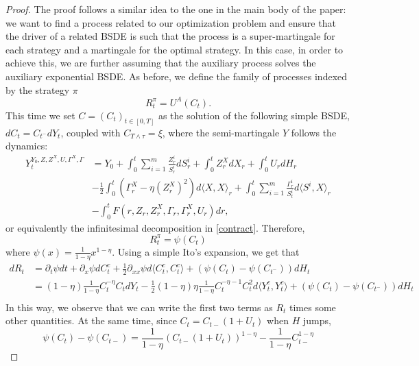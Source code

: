 \documentclass[11pt,a4paper]{article}
\theoremstyle{thmstyleone}%
\theoremstyle{thmstyletwo}%
\theoremstyle{thmstylethree}%
\newcommand{\T}{T \wedge \tau}
\begin{document}
\begin{proof}
    The proof follows a similar idea to the one in the main body of the paper: we want to find a process related to our optimization problem and ensure that the driver of a related BSDE is such that the process is a super-martingale for each strategy and a martingale for the optimal strategy. In this case, in order to achieve this, we are further assuming that the auxiliary process solves the auxiliary exponential BSDE. As before, we define the family of processes indexed by the strategy $\pi$
    \begin{equation*}
        R^{\pi}_{t} = U^A(C_t).
    \end{equation*}
    This time we set $C = (C_t)_{t \in [0, T]}$ as the solution of the following simple BSDE, $dC_t = C_{t^-} dY_t$, coupled with $C_{\T} = \xi$, where the semi-martingale $Y$ follows the dynamics:
    \begin{align*}
       Y_t^{Y_0,Z,Z^X,U,\Gamma^X,\Gamma}&= Y_0+ \int_{0}^{t}\sum_{i=1}^m \frac{Z^i_r}{S^i_r} dS^i_r + \int_{0 }^{t} Z_r^X dX_r + \int_{0}^{t} U_r dH_r \\
        &- \frac{1}{2}\int_{0}^{t} (\Gamma_r^X -\eta (Z_r^X)^2 ) d\langle X, X\rangle_r + \int_{0}^{t} \sum_{i=1}^m \frac{\Gamma_r^i}{S^i_t} d\langle S^i, X\rangle_r\\
        &- \int_{0}^{t} F(r, Z_r, Z_r^X, \Gamma_r, \Gamma_r^X, U_r) dr,
    \end{align*}
    or equivalently the infinitesimal decomposition in \eqref{contract}.
 Therefore,
    \[
        R_t^{\pi} = \psi(C_t)
    \]
    where $\psi( x) = \frac{1}{1-\eta}x^{1-\eta}$. Using a simple Ito's expansion, we get that
    \begin{align*}
        d R_t &= \partial_t\psi dt + \partial_x\psi dC^c_t + \frac{1}{2}\partial_{xx}\psi d\langle C^c_t, C^c_t\rangle + (\psi(C_t) - \psi(C_{t^-}))dH_t\\
        &= (1-\eta) \frac{1}{1-\eta} C_t^{-\eta} C_{t} dY_{t} - \frac{1}{2}(1-\eta)\eta \frac{1}{1-\eta} C_t^{-\eta-1} C_{t}^2  d\langle Y^c_t, Y^c_t\rangle+ (\psi(C_t) - \psi(C_{t^-}))dH_t\\
    \end{align*}
    In this way, we observe that we can write the first two terms as $R_t$ times some other quantities. At the same time, since $C_t = C_{t-}(1 + U_t)$ when $H$ jumps,
    \[
    \psi(C_t) - \psi(C_{t-}) 
    = \frac{1}{1-\eta} \left( C_{t-}(1 + U_t) \right)^{1-\eta} - \frac{1}{1-\eta} C_{t-}^{1-\eta}
\]
\end{proof}
\end{document}
